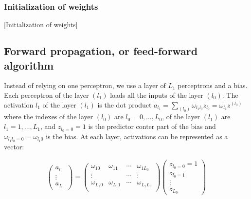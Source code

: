 \documentclass[final, paper=letter,5p,times,twocolumn]{elsarticle}
\begin{document}
\subsubsection{Initialization of weights}
[Initialization of weights]

\subsection{Forward propagation, or feed-forward algorithm}
Instead of relying on one perceptron, we use a layer of $L_{1}$ perceptrons and a bias. Each perceptron of the layer $(l_{1})$ loads all the inputs of the layer $(l_{0})$. The activation $l_{1}$ of the layer $(l_{1})$ is the dot product $a_{l_{1}} = \sum_{(l_{0})} \omega_{l_{1}l_{0}}z_{l_{0}} = \omega_{l_{1}}z^{(l_{0})}$ where the indexes of the layer $(l_{0})$ are $l_{0} = 0, \dots, L_{0}$, of the layer $(l_{1})$ are $l_{1} = 1, \dots, L_{1}$, and $z_{l_{0} = 0} = 1$ is the predictor conter part of the bias and $\omega_{l_{1}l_{0} = 0} = \omega_{l_{1}0}$ is the bias. At each layer, activations can be represented as a vector:

\begin{eqnarray*}
  \left(
  \begin{array}{c}
    a_{l_{1}} \\
    \vdots \\
    a_{L_{1}}
  \end{array}
  \right) = \left(
  \begin{array}{cccc}
    \omega_{10} & \omega_{11} & \cdots & \omega_{1L_{0}} \\
    \vdots     &            & \cdots & \vdots \\
    \omega_{L_{1}0} & \omega_{L_{1}1} & \cdots & \omega_{L_{1}L_{0}} \\
  \end{array}
  \right)  \left(
  \begin{array}{c}
    z_{l_{0} = 0} = 1 \\
    z_{l_{0} = 1} \\
    \vdots \\
    z_{L_{0}} 
  \end{array}
  \right)
\end{eqnarray*}
\end{document}
